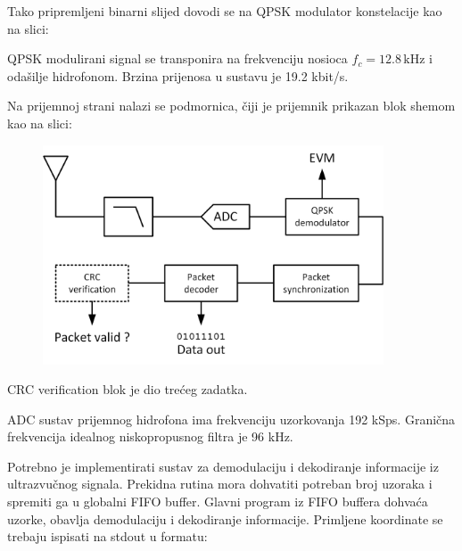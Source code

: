 \documentclass[a4paper]{article}
\begin{document}
Tako pripremljeni binarni slijed dovodi se na QPSK modulator konstelacije kao na slici:

\begin{figure}[h!]
\centering
{}
\end{figure}

QPSK modulirani signal se transponira na frekvenciju nosioca $f_c = 12.8 \,\textrm{kHz}$ i odašilje hidrofonom. Brzina prijenosa u sustavu je 19.2 kbit/s.

Na prijemnoj strani nalazi se podmornica, čiji je prijemnik prikazan blok shemom kao na slici:

\begin{figure}[h!]
\centering
\includegraphics[width=0.9\textwidth]{Task1.png}
\end{figure}

CRC verification blok je dio trećeg zadatka.

ADC sustav prijemnog hidrofona ima frekvenciju uzorkovanja 192 kSps. Granična frekvencija idealnog niskopropusnog filtra je 96 kHz.

Potrebno je implementirati sustav za demodulaciju i dekodiranje informacije iz ultrazvučnog signala. Prekidna rutina mora dohvatiti potreban broj uzoraka i spremiti ga u globalni FIFO buffer. Glavni program iz FIFO buffera dohvaća uzorke, obavlja demodulaciju i dekodiranje informacije. Primljene koordinate se trebaju ispisati na stdout u formatu:
\end{document}
